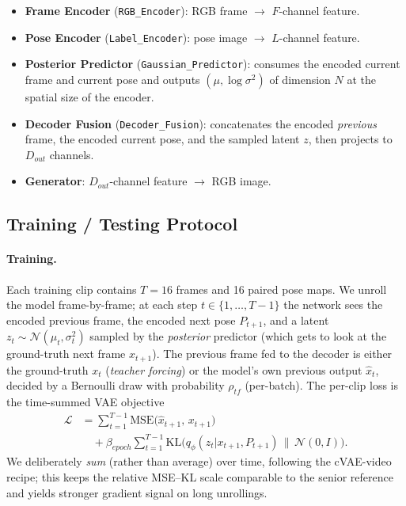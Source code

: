 \documentclass[10pt,twocolumn,letterpaper]{article}
\begin{document}
\begin{itemize}
    \item \textbf{Frame Encoder} (\texttt{RGB\_Encoder}): RGB frame $\to$ $F$-channel feature.
    \item \textbf{Pose Encoder} (\texttt{Label\_Encoder}): pose image $\to$ $L$-channel feature.
    \item \textbf{Posterior Predictor} (\texttt{Gaussian\_Predictor}): consumes the encoded current frame and current pose and outputs $(\mu,\log\sigma^2)$ of dimension $N$ at the spatial size of the encoder.
    \item \textbf{Decoder Fusion} (\texttt{Decoder\_Fusion}): concatenates the encoded \emph{previous} frame, the encoded current pose, and the sampled latent $z$, then projects to $D_{out}$ channels.
    \item \textbf{Generator}: $D_{out}$-channel feature $\to$ RGB image.
\end{itemize}

\subsection{Training / Testing Protocol}

\paragraph{Training.} Each training clip contains $T{=}16$ frames and 16 paired pose maps. We unroll the model frame-by-frame; at each step $t \in \{1,\ldots,T-1\}$ the network sees the encoded previous frame, the encoded next pose $P_{t+1}$, and a latent $z_t \sim \mathcal{N}(\mu_t, \sigma_t^2)$ sampled by the \emph{posterior} predictor (which gets to look at the ground-truth next frame $x_{t+1}$). The previous frame fed to the decoder is either the ground-truth $x_t$ (\emph{teacher forcing}) or the model's own previous output $\hat x_t$, decided by a Bernoulli draw with probability $\rho_{tf}$ (per-batch). The per-clip loss is the time-summed VAE objective
\begin{align*}
    \mathcal{L} &= \sum_{t=1}^{T-1} \mathrm{MSE}\bigl(\hat x_{t+1},\, x_{t+1}\bigr) \\
                &\quad + \beta_{epoch}\!\sum_{t=1}^{T-1} \mathrm{KL}\bigl(q_\phi(z_t|x_{t+1},P_{t+1})\,\|\,\mathcal{N}(0,I)\bigr).
\end{align*}
We deliberately \emph{sum} (rather than average) over time, following the cVAE-video recipe; this keeps the relative MSE--KL scale comparable to the senior reference and yields stronger gradient signal on long unrollings.
\end{document}
